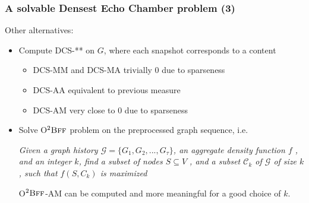 \documentclass{beamer}
\begin{document}
\begin{frame}[c]
	\frametitle{A solvable Densest Echo Chamber problem (3)}
	Other alternatives:

	\begin{itemize}
		\item Compute DCS-** on $G$, where each snapshot corresponds to a
		      content
		      \begin{itemize}
			      \item DCS-MM and DCS-MA trivially 0 due to sparseness
			      \item DCS-AA equivalent to previous measure
			      \item DCS-AM very close to 0 due to sparseness
		      \end{itemize}

		\item Solve O$^{2} \textsc{Bff}$ problem on the preprocessed graph
		      sequence, i.e.

		      \bigskip

		      \emph{Given a graph history $\mathcal{G}  = \{G_1 , G_2, . . . ,
				      G_{\tau}  \}$, an aggregate density function $f$ , and an
			      integer $k$, find a subset of nodes $S \subseteq V$ , and a
			      subset $\mathcal{C} _{k} $ of $\mathcal{G} $ of size $k$,
			      such that $f (S, C_k )$ is maximized}

		      \bigskip

		      O$^{2} \textsc{Bff}$-AM can be computed and more meaningful for a
		      good choice of $k$.
	\end{itemize}
\end{frame}
\end{document}
